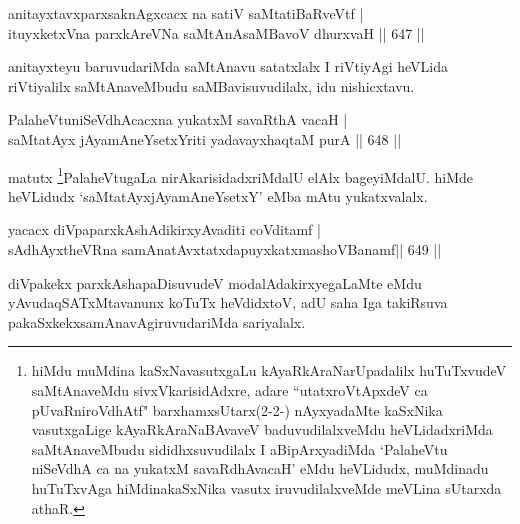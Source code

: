 \begin{shl}
\footnotemark[3]anitayxtavxparxsaknAgxcacx  na satiV saMtatiBaRveVtf | \\
ituyxketxVna parxkAreVNa saMtAnAsaMBavoV dhurxvaH \hfill||  647 ||  
\end{shl}	

\begin{artha}
anitayxteyu baruvudariMda saMtAnavu satatxlalx I riVtiyAgi heVLida riVtiyalilx saMtAnaveMbudu saMBavisuvudilalx, idu nishicxtavu.
\end{artha}

\centerline{}

\begin{shl}
PalaheVtuniSeVdhAcacxna yukatxM savaRthA vacaH | \\
saMtatAyx jAyamAneYsetxYriti yadavayxhaqtaM purA \hfill||  648 ||  
\end{shl}

\begin{artha}
matutx \footnote{hiMdu muMdina kaSxNavasutxgaLu kAyaRkAraNarUpadalilx huTuTxvudeV saMtAnaveMdu sivxVkarisidAdxre, adare ``utatxroVtApxdeV ca pUvaRniroVdhAtf" barxhamxsUtarx(2-2-) nAyxyadaMte kaSxNika vasutxgaLige kAyaRkAraNaBAvaveV baduvudilalxveMdu heVLidadxriMda saMtAnaveMbudu sididhxsuvudilalx I aBipArxyadiMda `PalaheVtu niSeVdhA ca na yukatxM savaRdhAvacaH' eMdu heVLidudx, muMdinadu huTuTxvAga hiMdinakaSxNika vasutx iruvudilalxveMde meVLina sUtarxda athaR.}PalaheVtugaLa nirAkarisidadxriMdalU elAlx bageyiMdalU. hiMde heVLidudx `saMtatAyxjAyamAneYsetxY' eMba mAtu yukatxvalalx.
\end{artha}

\begin{shl}
yacacx \footnotemark[2]diVpaparxkAshAdikirxyAvaditi coVditamf | \\
sAdhAyxtheVRna samAnatAvxtatxdapuyxkatxmashoVBanamf\hfill ||  649 ||  
\end{shl}

\begin{artha}
diVpakekx parxkAshapaDisuvudeV modalAdakirxyegaLaMte eMdu yAvudaqSATxMtavanunx koTuTx heVdidxtoV, adU saha Iga takiRsuva pakaSxkekxsamAnavAgiruvudariMda sariyalalx.
\end{artha}

